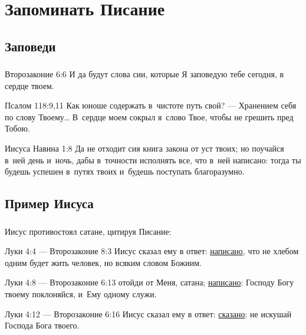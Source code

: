 \documentclass[t,aspectratio=169]{beamer}  %
\begin{document}
\section{Запоминать Писание}
\subsection{Заповеди}
\begin{frame}
	\frametitle{\insertsection}
	\framesubtitle{\insertsubsection}
	\begin{block}{Второзаконие 6:6}
	И да будут слова сии, которые Я заповедую тебе сегодня, в сердце твоем. 
	\end{block}

	\begin{block}{Псалом 118:9,11}
	Как юноше содержать в~чистоте путь свой? --- Хранением себя по слову Твоему\ldots{} 
	В~сердце моем сокрыл я~слово Твое, чтобы не грешить пред Тобою. 
\end{block}	
	\begin{block}{Иисуса Навина 1:8}
		Да не отходит сия книга закона от уст твоих; но поучайся в~ней день и~ночь, дабы в~точности исполнять все, что в~ней написано: тогда ты будешь успешен в~путях твоих и~будешь поступать благоразумно. 
	\end{block}
\end{frame}  
\subsection{Пример Иисуса}
\begin{frame}
	\frametitle{\insertsection}
	\framesubtitle{\insertsubsection}
Иисус противостоял сатане, цитируя Писание:

\begin{block}{Луки 4:4 --- Второзаконие 8:3}
Иисус сказал ему в ответ: \underline{написано}, что не хлебом одним будет жить человек, но всяким словом Божиим. 
\end{block}

\begin{block}{Луки 4:8 --- Второзаконие 6:13}
	отойди от Меня, сатана; \underline{написано}: Господу Богу твоему поклоняйся, и~Ему одному служи. 
\end{block}

\begin{block}{Луки 4:12 --- Второзаконие 6:16}
Иисус сказал ему в ответ: \underline{сказано}: не искушай Господа Бога твоего. 
\end{block}

\end{frame}    
\end{document}
